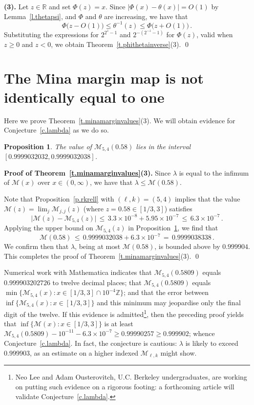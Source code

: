 \documentclass[letterpaper,11pt,oneside,reqno]{amsbook}
\newcommand{\R}{\ensuremath{\mathbb{R}}}
\newcommand{\Z}{\ensuremath{\mathbb{Z}}}
\numberwithin{figure}{chapter}
\newtheorem{proposition}[theorem]{Proposition}
\theoremstyle{definition}
\theoremstyle{definition}
\theoremstyle{definition}
\theoremstyle{definition}
\theoremstyle{definition}
\newcommand{\minamm}{\mathcal{M}}
\newcommand{\PhiMac}{\Phi}
\begin{document}
{\bf  (3).}
Let $z \in \R$ and set $\PhiMac(z) = x$.
Since $\vert \PhiMac(x) - \theta(x) \vert = O(1)$ by Lemma~\ref{l.thetapsi}, and $\PhiMac$ and $\theta$ are increasing, we have that
$$
 \PhiMac\big(z - O(1)\big)
 \leq \theta^{-1}(z) \leq  \PhiMac\big(z + O(1)\big) \, .
$$
Substituting the expressions for $2^{2^z - 1}$ and $2^{-(2^{-z} -1)}$ for $\PhiMac(z)$, valid when $z \geq 0$ and $z < 0$, we obtain Theorem~\ref{t.phithetainverse}(3). \qed


\section{The Mina margin map is not identically equal to one}\label{s.minamarginmap}
Here we prove Theorem~\ref{t.minamarginvalues}(3). We will obtain evidence for Conjecture~\ref{c.lambda} as we do so. 
\begin{proposition}\label{p.thevalueofminamargin}
The value of $\minamm_{5,4}(0.58)$ lies in the interval  $[0.9999032032 , 0.9999032038]$.
\end{proposition}

{\bf Proof of Theorem~\ref{t.minamarginvalues}(3).}  Since $\lambda$ is equal to the infimum of $\minamm(x)$ over $x \in (0,\infty)$, we have that $\lambda \leq \minamm(0.58)$.

Note that Proposition~\ref{p.rkrell} with $(\ell,k) = (5,4)$ implies that the value $\minamm(z) = \lim_j \minamm_{j,j}(z)$ (where $z = 0.58 \in [1/3,3]$)  satisfies
$$
 \big\vert  \minamm(z) - \minamm_{5,4}(z) \big\vert \, \leq \, 3.3 \times 10^{-8} + 5.95 \times 10^{-7} \, \leq \, 6.3 \times 10^{-7} \, .
$$
Applying the upper bound on $\minamm_{5,4}(z)$ in Proposition~\ref{p.thevalueofminamargin}, we find that
$$
 \minamm(0.58) \, \leq \, 0.9999032038 + 6.3 \times 10^{-7} \, = \, 0.9999038338  \, .
$$
We confirm then that $\lambda$, being at most $\minamm(0.58)$, is bounded above by $0.999904$. This completes the proof of Theorem~\ref{t.minamarginvalues}(3). \qed

Numerical work with Mathematica indicates that $\minamm_{5,4}(0.5809)$ equals  $0.999903202726$
to twelve decimal places; that $\minamm_{5,4}(0.5809)$ equals
 $\min \big\{ \minamm_{5,4}(x): x \in [1/3,3] \cap 10^{-4}\Z \big\}$; and that the error between $\inf \big\{ \minamm_{5,4}(x): x \in [1/3,3] \big\}$ and this minimum may jeopardise only the final digit of the twelve. If this evidence is admitted\footnote{Neo Lee and Adam Ousterovitch, U.C. Berkeley undergraduates, are working on putting such evidence on a rigorous footing: a forthcoming article will validate Conjecture~\ref{c.lambda}.}, then the preceding proof yields
 that $\inf \big\{ \minamm(x): x \in [1/3,3] \big\}$ is at least  $\minamm_{5,4}(0.5809) -10^{-11} -  6.3 \times 10^{-7} \geq 0.99990257 \geq 0.999902$; whence
  Conjecture~\ref{c.lambda}. In fact, the conjecture is cautious: $\lambda$ is likely to exceed $0.999903$, as an estimate on a higher indexed $\minamm_{\ell,k}$ might show.
 
\end{document}
